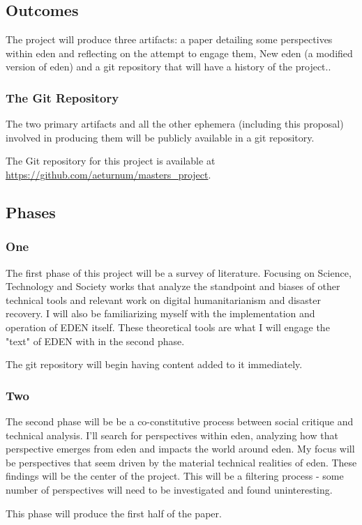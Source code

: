 \documentclass[a4paper,man,natbib]{apa6}
\begin{document}
   \subsection*{Outcomes}
   The project will produce three artifacts: a paper detailing some perspectives within \acrshort{eden} and reflecting on the attempt to engage them, New \acrshort{eden} (a modified version of \acrshort{eden}) and a git repository that will have a history of the project..
   \subsubsection*{The Git Repository}
   The two primary artifacts and all the other ephemera (including this proposal) involved in producing them will be publicly available in a git repository.

   The Git repository for this project is available at \url{https://github.com/aeturnum/masters_project}.

   \subsection*{Phases}
   \subsubsection*{One}
   The first phase of this project will be a survey of literature. Focusing on Science, Technology and Society works that analyze the standpoint and biases of other technical tools and relevant work on digital humanitarianism and disaster recovery. I will also be familiarizing myself with the implementation and operation of EDEN itself. These theoretical tools are what I will engage the "text" of EDEN with in the second phase. 
   \begin{flushleft}
   The git repository will begin having content added to it immediately.
   \end{flushleft}
   \subsubsection*{Two}
   The second phase will be be a co-constitutive process between social critique and technical analysis. I'll search for perspectives within \acrshort{eden}, analyzing how that perspective emerges from \acrshort{eden} and impacts the world around \acrshort{eden}. My focus will be perspectives that seem driven by the material technical realities of \acrshort{eden}. These findings will be the center of the project. This will be a filtering process - some number of perspectives will need to be investigated and found uninteresting. 
   \begin{flushleft}
   This phase will produce the first half of the paper.
   \end{flushleft}
\end{document}
